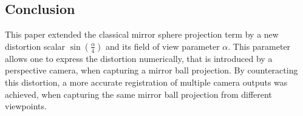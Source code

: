 \documentclass[10pt]{article}
\begin{document}
\begin{multicols}{2}
\section{Conclusion}
This paper extended the classical mirror sphere projection term by a new distortion scalar $\sin{\left(\frac{\alpha}{4}\right)}$ and its field of view parameter $\alpha$. This parameter allows one to express the distortion numerically, that is introduced by a perspective camera, when capturing a mirror ball projection. By counteracting this distortion, a more accurate registration of multiple camera outputs was achieved, when capturing the same mirror ball projection from different viewpoints.


\end{multicols}
\end{document}
